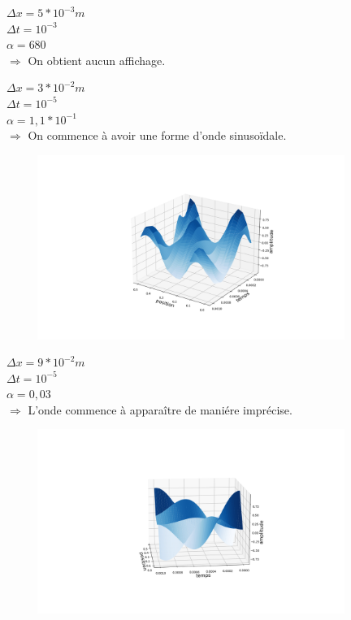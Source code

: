 \begin{enumerate}[label=\alph*)]

\begin{minipage}{.6\textwidth}%

\item $\Delta x=5*{10}^{-3}m$ \\
$\Delta t= {10}^{-3}$ \\
$\alpha= 680$\\


$\Longrightarrow$ On obtient aucun affichage.

\end{minipage}%

\begin{minipage}{.45\textwidth}%

\item $\Delta x=3*{10}^{-2}m$ \\
$\Delta t= {10}^{-5}$ \\
$\alpha= 1,1*{10}^{-1} $\\


$\Longrightarrow$ On commence à avoir une forme d'onde sinusoïdale. 

\end{minipage}%
\hfill
\begin{minipage}{.6\textwidth}%
\includegraphics[width=12cm,height=6cm]{dt=0.00001 avec dx=0.03.png}
\end{minipage}%

\begin{minipage}{.45\textwidth}%
\item $\Delta x=9*{10}^{-2}m$\\
$\Delta t={10}^{-5}$\\
$\alpha= 0,03$ \\
$\Longrightarrow$ L'onde commence à apparaître de maniére imprécise.
\end{minipage}%
\hfill
\begin{minipage}{.6\textwidth}%
\includegraphics[width=12cm,height=6cm]{dt=0.00001 et dx=0.09.png}
\end{minipage}%


\end{enumerate}
